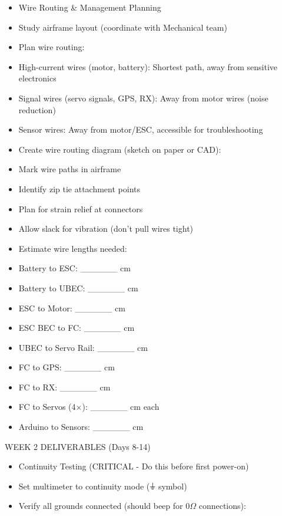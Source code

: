 \documentclass[11pt,letterpaper]{article}
\begin{document}
\begin{itemize}
  \item Wire Routing \& Management Planning
  \item Study airframe layout (coordinate with Mechanical team)
  \item Plan wire routing:
  \item High-current wires (motor, battery): Shortest path, away from sensitive electronics
  \item Signal wires (servo signals, GPS, RX): Away from motor wires (noise reduction)
  \item Sensor wires: Away from motor/ESC, accessible for troubleshooting
\end{itemize}

\begin{itemize}
  \item Create wire routing diagram (sketch on paper or CAD):
  \item Mark wire paths in airframe
  \item Identify zip tie attachment points
  \item Plan for strain relief at connectors
  \item Allow slack for vibration (don't pull wires tight)
\end{itemize}

\begin{itemize}
  \item Estimate wire lengths needed:
  \item Battery to ESC: \_\_\_\_\_\_ cm
  \item Battery to UBEC: \_\_\_\_\_\_ cm
  \item ESC to Motor: \_\_\_\_\_\_ cm
  \item ESC BEC to FC: \_\_\_\_\_\_ cm
  \item UBEC to Servo Rail: \_\_\_\_\_\_ cm
  \item FC to GPS: \_\_\_\_\_\_ cm
  \item FC to RX: \_\_\_\_\_\_ cm
  \item FC to Servos (4$\times$): \_\_\_\_\_\_ cm each
  \item Arduino to Sensors: \_\_\_\_\_\_ cm
\end{itemize}

WEEK 2 DELIVERABLES (Days 8-14)\par

\begin{itemize}
  \item Continuity Testing (CRITICAL - Do this before first power-on)
  \item Set multimeter to continuity mode (⏚ symbol)
  \item Verify all grounds connected (should beep for 0$\Omega$ connections):
\end{itemize}
\end{document}
